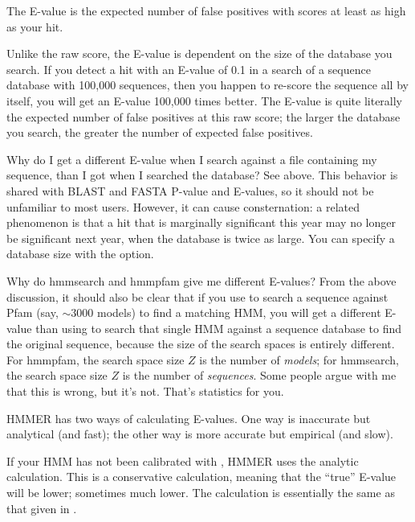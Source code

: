 The E-value is the expected number of false positives with scores at
least as high as your hit.

Unlike the raw score, the E-value is dependent on the size of the
database you search. If you detect a hit with an E-value of 0.1 in a
search of a sequence database with 100,000 sequences, then you happen
to re-score the sequence all by itself, you will get an E-value
100,000 times better. The E-value is quite literally the expected
number of false positives at this raw score; the larger the database
you search, the greater the number of expected false positives.

\begin{srefaq}{Why do I get a different E-value when I search
against a file containing my sequence, than I got when I searched the
database?} See above. This behavior is shared with BLAST and FASTA
P-value and E-values, so it should not be unfamiliar to most users.
However, it can cause consternation: a related phenomenon is that a
hit that is marginally significant this year may no longer be
significant next year, when the database is twice as large. You can
specify a database size with the  option.
\end{srefaq}

\begin{srefaq}{Why do hmmsearch and hmmpfam give me different
E-values?} From the above discussion, it should also be clear that if
you use  to search a sequence against Pfam (say, $\sim
3000$ models) to find a matching HMM, you will get a different E-value
than using  to search that single HMM against a
sequence database to find the original sequence, because the size of
the search spaces is entirely different. For hmmpfam, the search space
size $Z$ is the number of \emph{models}; for hmmsearch, the search
space size $Z$ is the number of \emph{sequences}. Some people argue
with me that this is wrong, but it's not. That's statistics for you.
\end{srefaq}

HMMER has two ways of calculating E-values. One way is inaccurate but
analytical (and fast); the other way is more accurate but empirical
(and slow).

If your HMM has not been calibrated with , HMMER
uses the analytic calculation. This is a conservative calculation,
meaning that the ``true'' E-value will be lower; sometimes much lower.
The calculation is essentially the same as that given in
\cite{Barrett97}.

